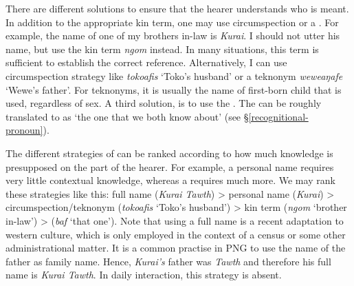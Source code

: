 There are different solutions to ensure that the hearer understands who is meant. In addition to the appropriate kin term, one may use circumspection or a  . For example, the name of one of my brothers in-law is \emph{Kurai}. I should not utter his name, but use the kin term \emph{ngom} instead. In many situations, this term is sufficient to establish the correct reference. Alternatively, I can use circumspection strategy like \emph{tokoafis} `Toko's husband' or a teknonym \emph{weweaŋafe} `Wewe's father'. For teknonyms, it is usually the name of first-born child that is used, regardless of sex. A third solution, is to use the  . The   can be roughly translated to  as `the one that we both know about' (see \S\ref{recognitional-pronoun}).%

The different strategies of  can be ranked according to how much knowledge is presupposed on the part of the hearer. For example, a personal name requires very little contextual knowledge, whereas a   requires much more. We may rank these strategies like this: full name (\emph{Kurai Tawth}) > personal name (\emph{Kurai}) > circumspection/teknonym (\emph{tokoafis} `Toko's husband') > kin term (\emph{ngom} `brother in-law') >  (\emph{baf} `that one'). Note that using a full name is a recent adaptation to western culture, which is only employed in the context of a census or some other administrational matter. It is a common practise in PNG to use the name of the father as family name. Hence, \emph{Kurai's} father was \emph{Tawth} and therefore his full name is \emph{Kurai Tawth}. In daily interaction, this strategy is absent.%

